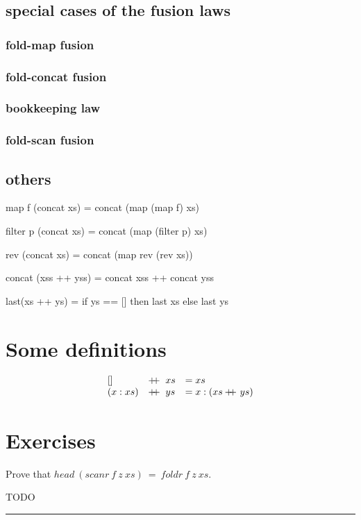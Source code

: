 \documentclass[twoside]{article}
\newenvironment{proof}{{\bf Proof:}}{\hfill\rule{2mm}{2mm}}
\newcommand\concat{+\kern-1.3ex+\kern0.8ex}
\begin{document}
\subsection{special cases of the fusion laws}
\subsubsection{fold-map fusion}
\subsubsection{fold-concat fusion}
\subsubsection{bookkeeping law}
\subsubsection{fold-scan fusion}

\subsection{others}

map f (concat xs) = concat (map (map f) xs)

filter p (concat xs) = concat (map (filter p) xs)

rev (concat xs) = concat (map rev (rev xs))

concat (xss ++ yss) = concat xss ++ concat yss

last(xs ++ ys) = if ys == [] then last xs else last ys

\section{Some definitions}

\[
\begin{array}{lll}
  []&\concat xs      &= xs\\
  (x:xs) &\concat ys &= x:(xs\concat ys)
\end{array}
\]

\section{Exercises}
Prove that $head~(scanr~f~z~xs)~=~foldr~f~z~xs$.

\begin{proof}
  TODO
\end{proof}
\end{document}
